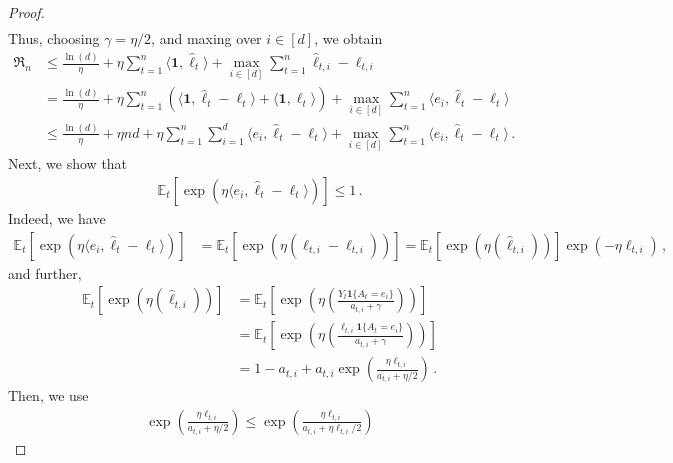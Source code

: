\documentclass{article}
\theoremstyle{plain}
\theoremstyle{definition}
\newcommand{\Reg}{\mathfrak{R}}
\newcommand{\E}{\mathbb E}
\newcommand{\hl}{\hat{\ell}\xspace}
\begin{document}
\begin{proof}[Proof]
\begin{align*}
    \end{align*}
    Thus, choosing $\gamma=\eta/2$,
    and maxing over $i \in [d]$,
    we obtain
    \begin{align*}
        \Reg_n
         &
        \leq \frac{\ln(d)}{\eta}
        +
        \eta
        \sum_{t=1}^n
        \langle\mathbf{1},\hl_t\rangle
        +
        \max_{i \in [d]}
        \sum_{t=1}^n
        \hl_{t,i}-\ell_{t,i}
        \\
         &
        = \frac{\ln(d)}{\eta}
        +
        \eta
        \sum_{t=1}^n
        \left(
        \langle\mathbf{1},\hl_t - \ell_t\rangle
        + \langle\mathbf{1},\ell_t\rangle
        \right)
        +
        \max_{i \in [d]}
        \sum_{t=1}^n
        \langle e_i, \hl_{t}-\ell_{t}\rangle
        \\
         &
        \leq \frac{\ln(d)}{\eta}
        +\eta nd
        +
        \eta
        \sum_{t=1}^n
        \sum_{i=1}^d
        \langle e_i,\hl_t - \ell_t\rangle
        +
        \max_{i \in [d]}
        \sum_{t=1}^n
        \langle e_i, \hl_{t}-\ell_{t}\rangle
        \,.
    \end{align*}
    Next, we show that
    \begin{align}
        \E_t[\exp(\eta \langle e_i, \hl_t - \ell_t\rangle)]
        \leq 1\,.
        \label{eq:exp-three-ix-mgf}
    \end{align}
    Indeed, we have
    \begin{align}
        \E_t[\exp(\eta \langle e_i, \hl_t - \ell_t\rangle)]
         & = \E_t[\exp(\eta (\hl_{t,i} - \ell_{t,i}))]
        = \E_t[\exp(\eta (\hl_{t,i}))] \exp(-\eta \ell_{t,i})\,,
        \label{eq:exp-three-ix-mgf-2}
    \end{align}
    and further,
    \begin{align*}
        \E_t[\exp(\eta (\hl_{t,i}))]
         & = \E_t\left[\exp\left(\eta \left(\frac{Y_t \mathbf{1}\{A_t = e_i\}}{a_{t,i} + \gamma}\right)\right)\right]        \\
         & = \E_t\left[\exp\left(\eta \left(\frac{\ell_{t,i} \mathbf{1}\{A_t = e_i\}}{a_{t,i} + \gamma}\right)\right)\right] \\
         & =
        1 - a_{t,i} + a_{t,i} \exp\left(\frac{\eta \ell_{t,i}}{a_{t,i} + \eta/2}\right)\,.
    \end{align*}
    Then, we use
    \begin{align}
        \exp\left(\frac{\eta \ell_{t,i}}{a_{t,i} + \eta/2}\right)
        \leq
        \exp\left(\frac{\eta \ell_{t,i}}{a_{t,i} + \eta\ell_{t,i}/2}\right)

\end{align}
\end{proof}
\end{document}
